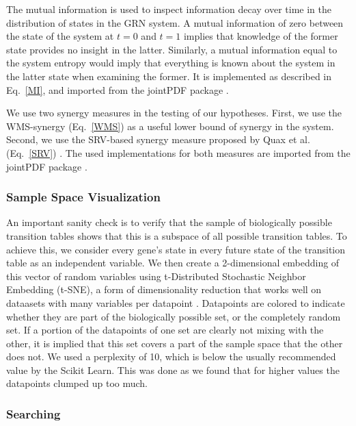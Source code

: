 \documentclass[../main.tex]{subfiles}
\begin{document}
The mutual information is used to inspect information decay over time in the distribution of states in the GRN system.
A mutual information of zero between the state of the system at $t=0$ and $t=1$ implies that knowledge of the former state provides no insight in the latter.
Similarly, a mutual information equal to the system entropy would imply that everything is known about the system in the latter state when examining the former.
It is implemented as described in Eq.~\ref{MI}, and imported from the jointPDF package \cite{jointpdf}.

We use two synergy measures in the testing of our hypotheses.
First, we use the WMS-synergy (Eq.~\ref{WMS}) as a useful lower bound of synergy in the system.
Second, we use the SRV-based synergy measure proposed by Quax et al. (Eq.~\ref{SRV}) \cite{quax2017quantifying}.
The used implementations for both measures are imported from the jointPDF package \cite{jointpdf}.


\subsubsection{Sample Space Visualization}

An important sanity check is to verify that the sample of biologically possible transition tables shows that this is a subspace of all possible transition tables.
To achieve this, we consider every gene's state in every future state of the transition table as an independent variable.
We then create a 2-dimensional embedding of this vector of random variables using t-Distributed Stochastic Neighbor Embedding (t-SNE), a form of dimensionality reduction that works well on dataasets with many variables per datapoint \cite{maaten2008visualizing}.
Datapoints are colored to indicate whether they are part of the biologically possible set, or the completely random set.
If a portion of the datapoints of one set are clearly not mixing with the other, it is implied that this set covers a part of the sample space that the other does not.
We used a perplexity of 10, which is below the usually recommended value by the Scikit Learn.
This was done as we found that for higher values the datapoints clumped up too much.

\subsubsection{Searching}
\end{document}
